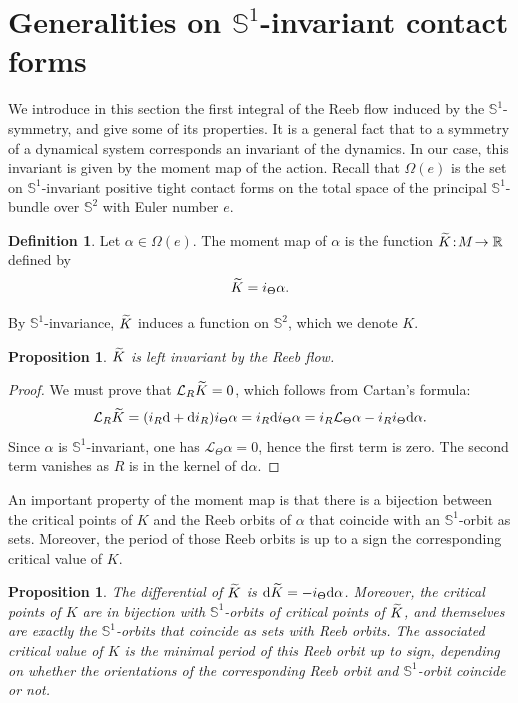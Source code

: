\documentclass[10pt,a4paper]{amsart}
\newcommand{\bbS}{\mathbb{S}}
\newcommand{\bbR}{\mathbb{R}}
\newcommand{\clL}{\mathcal{L}}
\newcommand{\rmd}{\mathrm{d}}
\renewcommand*{\to}{\mathchoice{\longrightarrow}{\rightarrow}{\rightarrow}{\rightarrow}}
\let\oldtilde\tilde
\renewcommand*{\tilde}[1]{\mathchoice{\widetilde{#1}}{\widetilde{#1}}{\oldtilde{#1}}{\oldtilde{#1}}}
\newtheorem{prop}[theo]{Proposition}
\theoremstyle{definition}\newtheorem{defi}[theo]{Definition}
\begin{document}
\section{Generalities on \texorpdfstring{$\bbS^1$}{S1}-invariant contact forms}\label{sec:generalites}
We introduce in this section the first integral of the Reeb flow induced by the $\bbS^1$-symmetry, and give some of its properties. It is a general fact that to a symmetry of a dynamical system corresponds an invariant of the dynamics. In our case, this invariant is given by the moment map of the action. Recall that $\Omega(e)$ is the set on $\bbS^1$-invariant positive tight contact forms on the total space of the principal $\bbS^1$-bundle over $\bbS^2$ with Euler number $e$.

\begin{defi}%
\!\!
Let $\alpha\! \in\! \Omega(e)$. The moment map of $\alpha$ is the function $\tilde K\! :\! M\! \to \bbR$ defined by
\[
\tilde K = i_{\Theta} \alpha.
\]
\end{defi}

By $\bbS^1$-invariance, $\tilde K$ induces a function on $\bbS^2$, which we denote $K$.

\begin{prop}\label{prop:K_invariant}
$\tilde K$ is left invariant by the Reeb flow.
\end{prop}

\begin{proof}
We must prove that $\clL_R \tilde K = 0$, which follows from Cartan's formula:
\[
\clL_R \tilde K = (i_R \rmd  + \rmd i_R)i_\Theta \alpha = i_R \rmd  i_\Theta \alpha = i_R \clL_\Theta \alpha - i_R i_\Theta \rmd \alpha.
\]
Since $\alpha$ is $\bbS^1$-invariant, one has $\clL_\Theta \alpha = 0$, hence the first term is zero. The second term vanishes as $R$ is in the kernel of $\rmd \alpha$.
\end{proof}

An important property of the moment map is that there is a bijection between the critical points of $K$ and the Reeb orbits of $\alpha$ that coincide with an $\bbS^1$-orbit as sets. Moreover, the period of those Reeb orbits is up to a sign the corresponding critical value of $K$.

\begin{prop}\label{prop:crit_K_S1_Reeb}
The differential of $\tilde K$ is $\rmd \tilde K = - i_\Theta \rmd \alpha$. Moreover, the critical points of $K$ are in bijection with $\bbS^1$-orbits of critical points of $\tilde K$, and themselves are exactly the $\bbS^1$-orbits that coincide as sets with Reeb orbits. The associated critical value of $K$ is the minimal period of this Reeb orbit up to sign, depending on whether the orientations of the corresponding Reeb orbit and $\bbS^1$-orbit coincide or not.
\end{prop}
\end{document}

